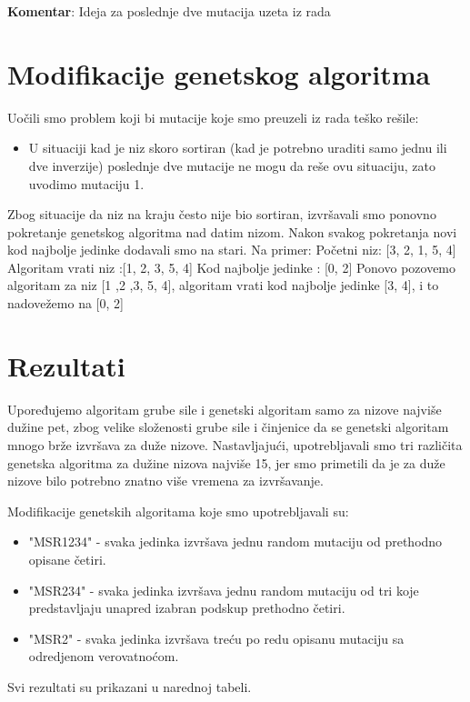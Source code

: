 \documentclass{article}
\begin{document}
\textbf{Komentar}: Ideja za poslednje dve mutacija uzeta iz rada \cite{prva}

\newpage
\section{Modifikacije genetskog algoritma}
Uočili smo  problem koji bi mutacije koje smo preuzeli iz rada teško rešile:
\begin{itemize}
\item  
U situaciji kad je niz skoro sortiran (kad je potrebno uraditi samo jednu ili dve inverzije) poslednje dve mutacije ne mogu da reše ovu situaciju, zato uvodimo mutaciju 1.
\end{itemize}
\newline


Zbog situacije da niz na kraju često nije bio sortiran, izvršavali smo ponovno pokretanje genetskog algoritma nad  datim nizom. Nakon svakog pokretanja novi kod najbolje jedinke dodavali smo na stari.
\newline
\newline
Na primer:
Početni niz: [3, 2, 1, 5, 4]
\newline
Algoritam vrati niz :[1, 2, 3, 5, 4]
\newline
Kod najbolje jedinke : [0, 2]
\newline
Ponovo pozovemo algoritam za niz [1 ,2 ,3, 5, 4], algoritam vrati kod najbolje jedinke [3, 4], i to nadovežemo na [0, 2]



\newpage








\section{Rezultati}\label{sec:rez}
Upoređujemo algoritam grube sile i genetski algoritam samo za nizove najviše dužine pet, zbog velike složenosti grube sile i činjenice da se genetski algoritam mnogo brže izvršava za duže nizove.
\newline
\newline
Nastavljajući, upotrebljavali smo tri različita genetska algoritma za dužine nizova  najviše 15, jer smo primetili da je za duže nizove bilo potrebno znatno više vremena za izvršavanje.

Modifikacije genetskih algoritama koje smo upotrebljavali su:
\begin{itemize}
\item 
"MSR1234" - svaka jedinka izvršava jednu random mutaciju od prethodno opisane četiri.
\item
"MSR234" - svaka jedinka izvršava  jednu random mutaciju od tri koje predstavljaju unapred izabran podskup prethodno četiri.
\item 
"MSR2" - svaka jedinka izvršava treću po redu opisanu mutaciju sa odredjenom verovatnoćom.
\end{itemize}
\newline
\newline
Svi rezultati su prikazani u narednoj tabeli.
\newline
\end{document}
